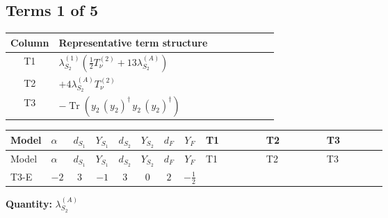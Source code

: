 \documentclass[8pt]{article}
\begin{document}
\begin{landscape}
\subsection*{Terms 1 of 5}
\begin{center}
\begin{tabular}{@{}c >{\raggedright\arraybackslash}p{0.82\linewidth}@{}}
\toprule
Column & Representative term structure \\
\midrule
T1 & \(\displaystyle {\lambda_{S_2}^{(1)}} \left(\frac{1}{2} T_{\nu}^{(2)}+13 {\lambda_{S_2}^{(A)}}\right)\) \\
\midrule
T2 & \(\displaystyle +4 {\lambda_{S_2}^{(A)}} T_{\nu}^{(2)}\) \\
\midrule
T3 & \(\displaystyle -\operatorname{Tr}\!\left({y_2}\,\left({y_2}\right)^{\dagger}\,{y_2}\,\left({y_2}\right)^{\dagger}\right)\) \\
\midrule
\bottomrule
\end{tabular}
\end{center}
\smallskip
\tiny
\begin{longtable}{@{}llcccccc >{\raggedright\arraybackslash}p{0.21\linewidth} >{\raggedright\arraybackslash}p{0.21\linewidth} >{\raggedright\arraybackslash}p{0.21\linewidth}@{}}
\toprule
Model & $\alpha$ & $d_{S_1}$ & $Y_{S_1}$ & $d_{S_2}$ & $Y_{S_2}$ & $d_F$ & $Y_F$ & T1 & T2 & T3 \\
\midrule
\endfirsthead
\toprule
Model & $\alpha$ & $d_{S_1}$ & $Y_{S_1}$ & $d_{S_2}$ & $Y_{S_2}$ & $d_F$ & $Y_F$ & T1 & T2 & T3 \\
\midrule
\endhead
T3-E & $-2$ & $3$ & $-1$ & $3$ & $0$ & $2$ & $-\frac{1}{2}$ & \scriptsize\adjustbox{max width=\linewidth}{$\begin{gathered} {\lambda_{S_2}^{(1)}} \left(\frac{1}{2} T_{\nu}^{(2)}+13 {\lambda_{S_2}^{(A)}}\right)\end{gathered}$} & \scriptsize\adjustbox{max width=\linewidth}{$\begin{gathered} +4 {\lambda_{S_2}^{(A)}} T_{\nu}^{(2)}\end{gathered}$} & \scriptsize\adjustbox{max width=\linewidth}{$\begin{gathered} -\operatorname{Tr}\!\left({y_2}\,\left({y_2}\right)^{\dagger}\,{y_2}\,\left({y_2}\right)^{\dagger}\right)\end{gathered}$} \\
\midrule
\bottomrule
\end{longtable}
\clearpage
\noindent\textbf{Quantity: }$\lambda_{S_2}^{(A)}$\par\smallskip

\end{landscape}
\end{document}
